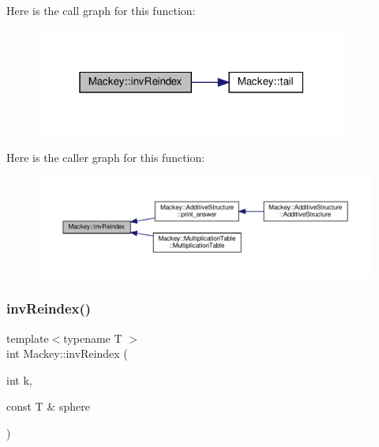 Here is the call graph for this function\+:\nopagebreak
\begin{figure}[H]
\begin{center}
\leavevmode
\includegraphics[width=292pt]{namespaceMackey_a5efb3695c450e4e590b86f20700f726b_cgraph}
\end{center}
\end{figure}
Here is the caller graph for this function\+:\nopagebreak
\begin{figure}[H]
\begin{center}
\leavevmode
\includegraphics[width=350pt]{namespaceMackey_a5efb3695c450e4e590b86f20700f726b_icgraph}
\end{center}
\end{figure}
\mbox{\label{namespaceMackey_a011b8e23bc2eedf751a9ce7bdc9e4cb9}} 
\subsubsection{\texorpdfstring{inv\+Reindex()}{invReindex()}\hspace{0.1cm}{\footnotesize\ttfamily [2/2]}}
{\footnotesize\ttfamily template$<$typename T $>$ \\
int Mackey\+::inv\+Reindex (\begin{DoxyParamCaption}\item[{int}]{k,  }\item[{const T \&}]{sphere }\end{DoxyParamCaption})\hspace{0.3cm}{\ttfamily [inline]}}



